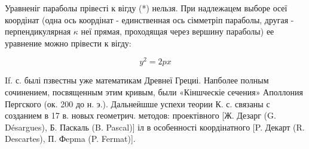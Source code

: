 \documentclass[10pt]{article}
\begin{document}
Уравненіг параболы прівесті к вігду (*) нельзя. При надлежацем выборе осеї коордінат (одна ось коордінат - единственная ось сімметріп параболы, другая - перпендикулярная $\kappa$ неї прямая, проходящая через вершину параболы) ее уравнение можно прівести к вігду:



\[

y^{2}=2 p x

\]



If. с. былі пзвестны уже математикам Древнеї Грециі. Напболее полным сочинением, посвященным этим кривым, были «Кіншческіе сечения» Аполлония Пергского (ок. 200 до н. э.). Дальнеӥшше успехи теории К. с. связаны с созданием в 17 в. новых геометрич. методов: проектівного [Ж. Дезарг (G. Désargues), Б. Паскаль (B. Pascal)] іл в особенності коордінатного [P. Декарт (R. Descartes), П. Фepma (P. Fermat)].
\end{document}
